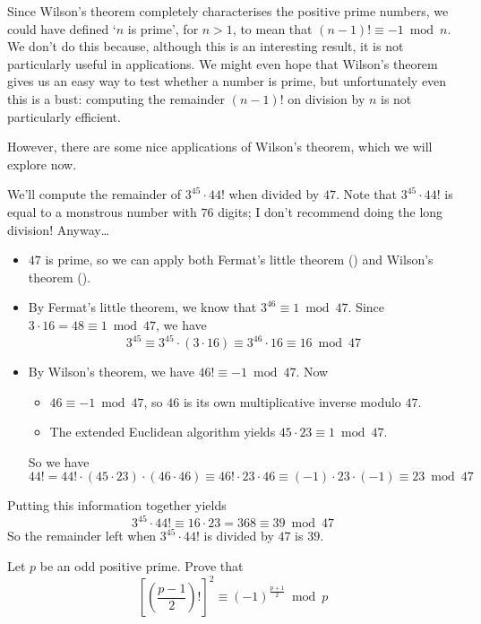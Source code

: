Since Wilson's theorem completely characterises the positive prime numbers, we could have defined `$n$ is prime', for $n > 1$, to mean that $(n-1)! \equiv -1 \bmod n$. We don't do this because, although this is an interesting result, it is not particularly useful in applications. We might even hope that Wilson's theorem gives us an easy way to test whether a number is prime, but unfortunately even this is a bust: computing the remainder $(n-1)!$ on division by $n$ is not particularly efficient.

However, there are some nice applications of Wilson's theorem, which we will explore now.

\begin{example}
We'll compute the remainder of $3^{45} \cdot 44!$ when divided by $47$. Note that $3^{45} \cdot 44!$ is equal to a monstrous number with $76$ digits; I don't recommend doing the long division! Anyway\dots{}
\begin{itemize} 
\item $47$ is prime, so we can apply both Fermat's little theorem () and Wilson's theorem ().
\item By Fermat's little theorem, we know that $3^{46} \equiv 1 \bmod 47$. Since $3 \cdot 16 = 48 \equiv 1 \bmod{47}$, we have
\[ 3^{45} \equiv 3^{45} \cdot (3 \cdot 16) \equiv 3^{46} \cdot 16 \equiv 16 \bmod{47} \]
\item By Wilson's theorem, we have $46! \equiv -1 \bmod 47$. Now
\begin{itemize}
\item $46 \equiv -1 \bmod{47}$, so $46$ is its own multiplicative inverse modulo $47$.
\item The extended Euclidean algorithm yields $45 \cdot 23 \equiv 1 \bmod 47$.
\end{itemize}
So we have
\[ 44! = 44! \cdot (45 \cdot 23) \cdot (46 \cdot 46) \equiv 46! \cdot 23 \cdot 46 \equiv (-1) \cdot 23 \cdot (-1) \equiv 23 \bmod{47} \]
\end{itemize}
Putting this information together yields
\[ 3^{45} \cdot 44! \equiv 16 \cdot 23 = 368 \equiv 39 \bmod 47 \]
So the remainder left when $3^{45} \cdot 44!$ is divided by $47$ is $39$.
\end{example}

\begin{exercise}
Let $p$ be an odd positive prime. Prove that
\[ \left[ \left( \frac{p-1}{2} \right)! \right]^2 \equiv (-1)^{\frac{p+1}{2}} \bmod p \]
\end{exercise}

